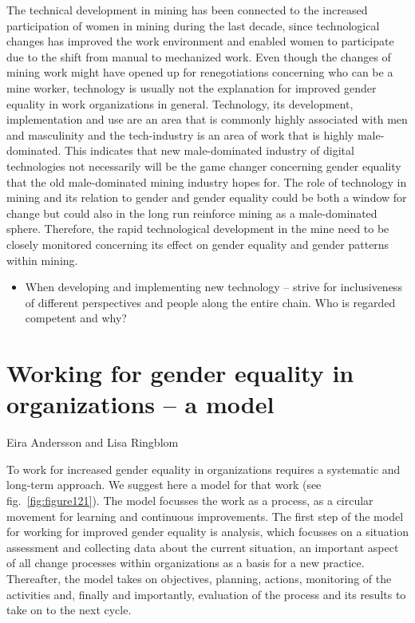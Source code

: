 \documentclass[
  12pt,
]{scrbook}
\providecommand{\tightlist}{%
  \setlength{\itemsep}{0pt}\setlength{\parskip}{0pt}}
\newenvironment{chap-auth}
{\vspace{1cm}\begin{center}\begin{flushright}\sffamily\noindent}
  {\end{flushright}\end{center}\vspace{1cm}}
\begin{document}
The technical development in mining has been connected to the increased participation of women in mining during the last decade, since technological changes has improved the work environment and enabled women to participate due to the shift from manual to mechanized work. Even though the changes of mining work might have opened up for renegotiations concerning who can be a mine worker, technology is usually not the explanation for improved gender equality in work organizations in general. Technology, its development, implementation and use are an area that is commonly highly associated with men and masculinity and the tech-industry is an area of work that is highly male-dominated. This indicates that new male-dominated industry of digital technologies not necessarily will be the game changer concerning gender equality that the old male-dominated mining industry hopes for. The role of technology in mining and its relation to gender and gender equality could be both a window for change but could also in the long run reinforce mining as a male-dominated sphere. Therefore, the rapid technological development in the mine need to be closely monitored concerning its effect on gender equality and gender patterns within mining.

\begin{itemize}
\tightlist
\item
  When developing and implementing new technology -- strive for inclusiveness of different perspectives and people along the entire chain. Who is regarded competent and why?
\end{itemize}

\hypertarget{working-for-gender-equality-in-organizations-a-model}{%
\chapter{Working for gender equality in organizations -- a model}\label{working-for-gender-equality-in-organizations-a-model}}

\begin{chap-auth}
Eira Andersson and Lisa Ringblom
\end{chap-auth}

To work for increased gender equality in organizations requires a systematic and long-term approach. We suggest here a model for that work (see fig.~\ref{fig:figure121}). The model focusses the work as a process, as a circular movement for learning and continuous improvements. The first step of the model for working for improved gender equality is analysis, which focusses on a situation assessment and collecting data about the current situation, an important aspect of all change processes within organizations as a basis for a new practice. Thereafter, the model takes on objectives, planning, actions, monitoring of the activities and, finally and importantly, evaluation of the process and its results to take on to the next cycle.
\end{document}
